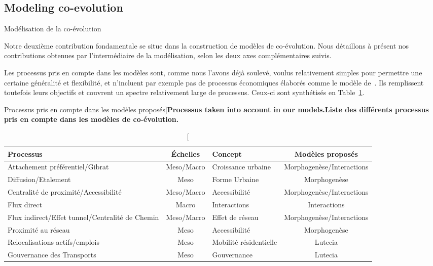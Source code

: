 


\subsection{Modeling co-evolution}{Modélisation de la co-évolution}


Notre deuxième contribution fondamentale se situe dans la construction de modèles de co-évolution. Nous détaillons à présent nos contributions obtenues par l'intermédiaire de la modélisation, selon les deux axes complémentaires suivis.


Les processus pris en compte dans les modèles sont, comme nous l'avons déjà soulevé, voulus relativement simples pour permettre une certaine généralité et flexibilité, et n'incluent par exemple pas de processus économiques élaborés comme le modèle de~\cite{levinson2007co}. Ils remplissent toutefois leurs objectifs et couvrent un spectre relativement large de processus. Ceux-ci sont synthétisés en Table~\ref{tab:contributions:modeled}. 


\begin{table}
\caption[Processus taken into account in our models][Processus pris en compte dans les modèles proposés]{\textbf{Processus taken into account in our models.}\label{tab:contributions:modeled}}{\textbf{Liste des différents processus pris en compte dans les modèles de co-évolution.}\label{tab:contributions:modeled}}
\begin{tabular}[6pt]{|p{4cm}|c|p{4cm}|c|}
\hline
Processus & Échelles & Concept & Modèles proposés\\\hline
Attachement préférentiel/Gibrat  & Meso/Macro & Croissance urbaine & Morphogenèse/Interactions \\\hline
Diffusion/Etalement & Meso & Forme Urbaine & Morphogenèse \\\hline
Centralité de proximité/Accessibilité & Meso/Macro & Accessibilité & Morphogenèse/Interactions \\\hline
Flux direct & Macro & Interactions & Interactions\\\hline
Flux indirect/Effet tunnel/Centralité de Chemin & Meso/Macro & Effet de réseau & Morphogenèse/Interactions \\\hline
Proximité au réseau & Meso & Accessibilité & Morphogenèse \\\hline
Relocalisations actifs/emplois & Meso & Mobilité résidentielle & Lutecia\\\hline
Gouvernance des Transports & Meso & Gouvernance & Lutecia\\\hline
\end{tabular}
\end{table}



